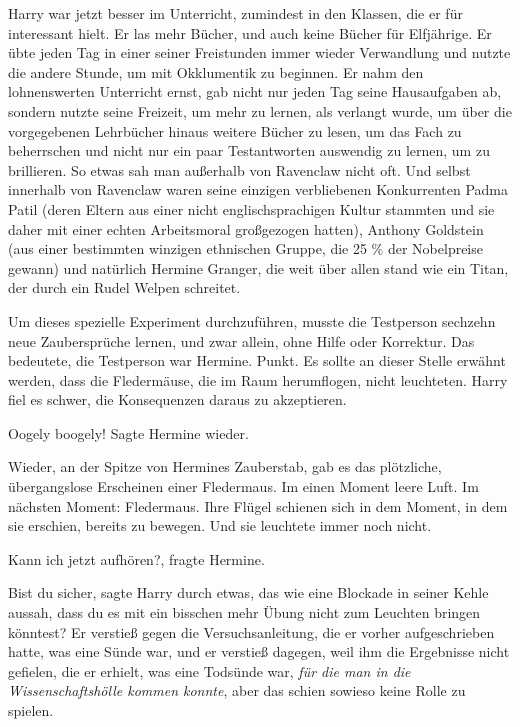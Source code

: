 Harry war jetzt besser im Unterricht, zumindest in den Klassen, die er für
interessant hielt. Er las mehr Bücher, und auch keine Bücher für Elfjährige. Er
übte jeden Tag in einer seiner Freistunden immer wieder Verwandlung und nutzte
die andere Stunde, um mit Okklumentik zu beginnen. Er nahm den lohnenswerten
Unterricht ernst, gab nicht nur jeden Tag seine Hausaufgaben ab, sondern nutzte
seine Freizeit, um mehr zu lernen, als verlangt wurde, um über die vorgegebenen
Lehrbücher hinaus weitere Bücher zu lesen, um das Fach zu beherrschen und nicht
nur ein paar Testantworten auswendig zu lernen, um zu brillieren. So etwas sah
man außerhalb von Ravenclaw nicht oft. Und selbst innerhalb von Ravenclaw waren
seine einzigen verbliebenen Konkurrenten Padma Patil (deren Eltern aus einer
nicht englischsprachigen Kultur stammten und sie daher mit einer echten
Arbeitsmoral großgezogen hatten), Anthony Goldstein (aus einer bestimmten
winzigen ethnischen Gruppe, die 25 \% der Nobelpreise gewann) und natürlich
Hermine Granger, die weit über allen stand wie ein Titan, der durch ein Rudel
Welpen schreitet.

Um dieses spezielle Experiment durchzuführen, musste die Testperson sechzehn
neue Zaubersprüche lernen, und zwar allein, ohne Hilfe oder Korrektur. Das
bedeutete, die Testperson war Hermine. Punkt. Es sollte an dieser Stelle erwähnt
werden, dass die Fledermäuse, die im Raum herumflogen, nicht leuchteten. Harry
fiel es schwer, die Konsequenzen daraus zu akzeptieren.

\glqq{}Oogely boogely!\grqq{} Sagte Hermine wieder.

Wieder, an der Spitze von Hermines Zauberstab, gab es das plötzliche,
übergangslose Erscheinen einer Fledermaus. Im einen Moment leere Luft. Im
nächsten Moment: Fledermaus. Ihre Flügel schienen sich in dem Moment, in dem sie
erschien, bereits zu bewegen. Und sie leuchtete immer noch nicht.

\glqq{}Kann ich jetzt aufhören?\grqq{}, fragte Hermine.

\glqq{}Bist du sicher\grqq{}, sagte Harry durch etwas, das wie eine Blockade in
seiner Kehle aussah, \glqq{}dass du es mit ein bisschen mehr Übung nicht zum
Leuchten bringen könntest?\grqq{} Er verstieß gegen die Versuchsanleitung, die
er vorher aufgeschrieben hatte, was eine Sünde war, und er verstieß dagegen,
weil ihm die Ergebnisse nicht gefielen, die er erhielt, was eine Todsünde war,
\emph{für die man in die Wissenschaftshölle kommen konnte}, aber das schien
sowieso keine Rolle zu spielen.

